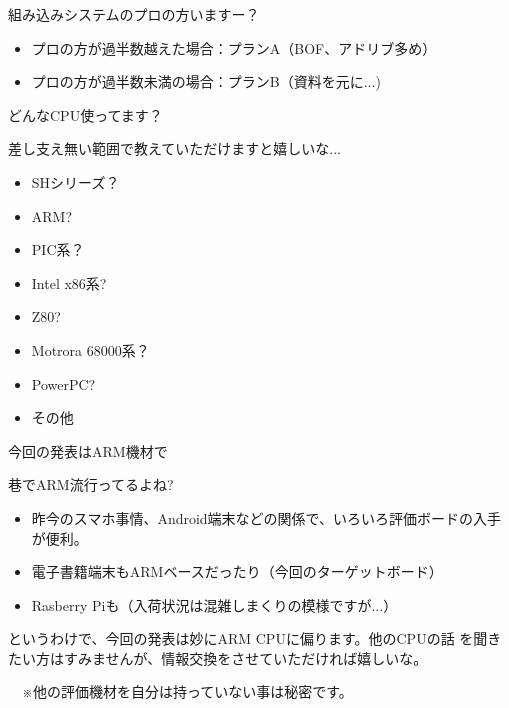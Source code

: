 \begin{frame}{組み込みシステムのプロの方いますー？}

\begin{itemize}
\item プロの方が過半数越えた場合：プランA（BOF、アドリブ多め）
\item プロの方が過半数未満の場合：プランB（資料を元に...)
\end{itemize}

\end{frame}

\begin{frame}{どんなCPU使ってます？}

差し支え無い範囲で教えていただけますと嬉しいな...

\begin{itemize}
\item SHシリーズ？
\item ARM?
\item PIC系？
\item Intel x86系?
\item Z80?
\item Motrora 68000系？
\item PowerPC?
\item その他
\end{itemize}

\end{frame}

\begin{frame}{今回の発表はARM機材で}

巷でARM流行ってるよね?

\begin{itemize}
\item 昨今のスマホ事情、Android端末などの関係で、いろいろ評価ボードの入手が便利。
\item 電子書籍端末もARMベースだったり（今回のターゲットボード）
\item Rasberry Piも（入荷状況は混雑しまくりの模様ですが...）
\end{itemize}

 というわけで、今回の発表は妙にARM CPUに偏ります。他のCPUの話
を聞きたい方はすみませんが、情報交換をさせていただければ嬉しいな。

　※他の評価機材を自分は持っていない事は秘密です。

\end{frame}

